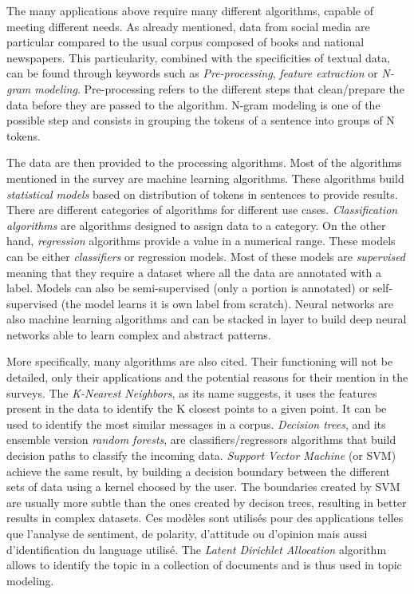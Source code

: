 The many applications above require many different algorithms, capable of meeting different needs.
As already mentioned, data from social media are particular compared to the usual corpus composed of books and national newspapers.
This particularity, combined with the specificities of textual data, can be found through keywords such as \emph{Pre-processing}, \emph{feature extraction} or \emph{N-gram modeling}.
Pre-processing refers to the different steps that clean/prepare the data before they are passed to the algorithm.
N-gram modeling is one of the possible step and consists in grouping the tokens of a sentence into groups of N tokens.

The data are then provided to the processing algorithms.
Most of the algorithms mentioned in the survey are machine learning algorithms.
These algorithms build \emph{statistical models} based on distribution of tokens in sentences to provide results.
There are different categories of algorithms for different use cases.
\emph{Classification algorithms} are algorithms designed to assign data to a category.
On the other hand, \emph{regression} algorithms provide a value in a numerical range.
These models can be either \emph{classifiers} or regression models.
Most of these models are \emph{supervised} meaning that they require a dataset where all the data are annotated with a label.
Models can also be semi-supervised (only a portion is annotated) or self-supervised (the model learns it is own label from scratch).
Neural networks are also machine learning algorithms and can be stacked in layer to build deep neural networks able to learn complex and abstract patterns.

More specifically, many algorithms are also cited. Their functioning will not be detailed, only their applications and the potential reasons for their mention in the surveys.
The \emph{K-Nearest Neighbors}, as its name suggests, it uses the features present in the data to identify the K closest points to a given point.
It can be used to identify the most similar messages in a corpus.
\emph{Decision trees}, and its ensemble version \emph{random forests}, are classifiers/regressors algorithms that build decision paths to classify the incoming data.
\emph{Support Vector Machine} (or SVM) achieve the same result, by building a decision boundary between the different sets of data using a kernel choosed by the user.
The boundaries created by SVM are usually more subtle than the ones created by decison trees, resulting in better results in complex datasets.
Ces modèles sont utilisés pour des applications telles que l'analyse de sentiment, de polarity, d'attitude ou d'opinion mais aussi d'identification du language utilisé.
The \emph{Latent Dirichlet Allocation} algorithm allows to identify the topic in a collection of documents and is thus used in topic modeling.

